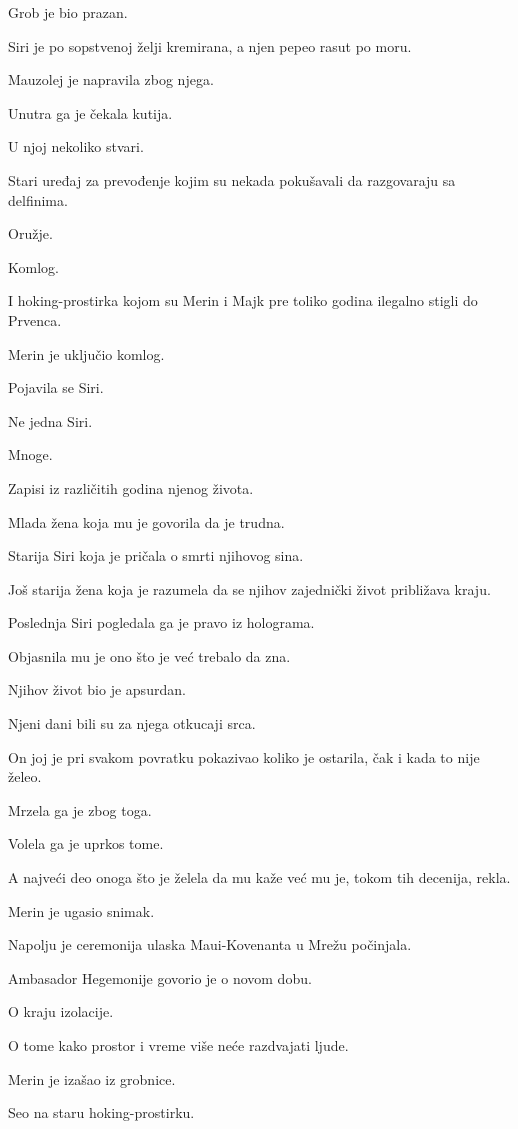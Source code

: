 Grob je bio prazan.

Siri je po sopstvenoj želji kremirana, a njen pepeo rasut po moru.

Mauzolej je napravila zbog njega.

Unutra ga je čekala kutija.

U njoj nekoliko stvari.

Stari uređaj za prevođenje kojim su nekada pokušavali da razgovaraju sa delfinima.

Oružje.

Komlog.

I hoking-prostirka kojom su Merin i Majk pre toliko godina ilegalno stigli do Prvenca.

Merin je uključio komlog.

Pojavila se Siri.

Ne jedna Siri.

Mnoge.

Zapisi iz različitih godina njenog života.

Mlada žena koja mu je govorila da je trudna.

Starija Siri koja je pričala o smrti njihovog sina.

Još starija žena koja je razumela da se njihov zajednički život približava kraju.

Poslednja Siri pogledala ga je pravo iz holograma.

Objasnila mu je ono što je već trebalo da zna.

Njihov život bio je apsurdan.

Njeni dani bili su za njega otkucaji srca.

On joj je pri svakom povratku pokazivao koliko je ostarila, čak i kada to nije želeo.

Mrzela ga je zbog toga.

Volela ga je uprkos tome.

A najveći deo onoga što je želela da mu kaže već mu je, tokom tih decenija, rekla.

Merin je ugasio snimak.

Napolju je ceremonija ulaska Maui-Kovenanta u Mrežu počinjala.

Ambasador Hegemonije govorio je o novom dobu.

O kraju izolacije.

O tome kako prostor i vreme više neće razdvajati ljude.

Merin je izašao iz grobnice.

Seo na staru hoking-prostirku.

